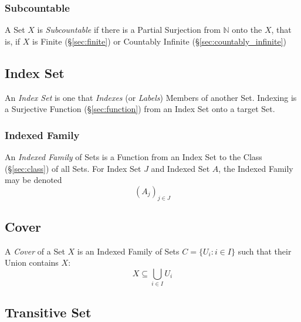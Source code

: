 \subsubsection{Subcountable}\label{sec:subcountable}

A Set $X$ is \emph{Subcountable} if there is a Partial Surjection from
$\mathbb{N}$ onto the $X$, that is, if $X$ is Finite
(\S\ref{sec:finite}) or Countably Infinite
(\S\ref{sec:countably_infinite})



\subsection{Index Set}\label{sec:index_set}

An \emph{Index Set} is one that \emph{Indexes} (or \emph{Labels})
Members of another Set. Indexing is a Surjective Function
(\S\ref{sec:function}) from an Index Set onto a target Set.



\subsubsection{Indexed Family}\label{sec:indexed_family}

An \emph{Indexed Family} of Sets is a Function from an Index Set to
the Class (\S\ref{sec:class}) of all Sets. For Index Set $J$ and
Indexed Set $A$, the Indexed Family may be denoted
\[
  (A_j)_{j \in J}
\]



\subsection{Cover}\label{sec:cover}

A \emph{Cover} of a Set $X$ is an Indexed Family of Sets $C = \{ U_i :
i \in I \}$ such that their Union contains $X$:
\[
  X \subseteq \bigcup_{i \in I} U_i
\]



\subsection{Transitive Set}\label{sec:transitive_set}

